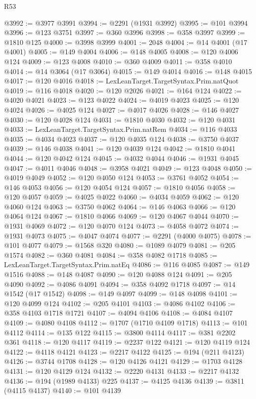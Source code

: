 \begin{lexlean}{R53}
\begin{coremodule}
@3992 := @3977 @3991
@3994 := @2291 (@1931 @3992)
@3995 := @101 @3994
@3996 := @123 @3751
@3997 := @360 @3996
@3998 := @358 @3997
@3999 := @1810 @125
@4000 := @3998 @3999
@4001 := 2048
@4004 := @14 @4001 (@17 @4001)
@4005 := @149 @4004
@4006 := @148 @4005
@4008 := @120 @4006 @124
@4009 := @123 @4008
@4010 := @360 @4009
@4011 := @358 @4010
@4014 := @14 @3064 (@17 @3064)
@4015 := @149 @4014
@4016 := @148 @4015
@4017 := @120 @4016
@4018 := LexLeanTarget.TargetSyntax.Prim.natQuot
@4019 := @116 @4018
@4020 := @120 @2026
@4021 := @164 @124
@4022 := @4020 @4021
@4023 := @123 @4022
@4024 := @4019 @4023
@4025 := @120 @4024
@4026 := @4025 @124
@4027 := @4017 @4026
@4028 := @146 @4027
@4030 := @120 @4028 @124
@4031 := @1810 @4030
@4032 := @120 @4031
@4033 := LexLeanTarget.TargetSyntax.Prim.natRem
@4034 := @116 @4033
@4035 := @4034 @4023
@4037 := @120 @4035 @124
@4038 := @3750 @4037
@4039 := @146 @4038
@4041 := @120 @4039 @124
@4042 := @1810 @4041
@4044 := @120 @4042 @124
@4045 := @4032 @4044
@4046 := @1931 @4045
@4047 := @4011 @4046
@4048 := @3958 @4021
@4049 := @123 @4048
@4050 := @4019 @4049
@4052 := @120 @4050 @124
@4053 := @3761 @4052
@4054 := @146 @4053
@4056 := @120 @4054 @124
@4057 := @1810 @4056
@4058 := @120 @4057
@4059 := @4025 @4022
@4060 := @4034 @4059
@4062 := @120 @4060 @124
@4063 := @3750 @4062
@4064 := @146 @4063
@4066 := @120 @4064 @124
@4067 := @1810 @4066
@4069 := @120 @4067 @4044
@4070 := @1931 @4069
@4072 := @120 @4070 @124
@4073 := @4058 @4072
@4074 := @1931 @4073
@4075 := @4047 @4074
@4077 := @2291 (@4000 @4075)
@4078 := @101 @4077
@4079 := @1568 @320
@4080 := @1089 @4079
@4081 := @205 @1574
@4082 := @360 @4081
@4084 := @358 @4082 @1718
@4085 := LexLeanTarget.TargetSyntax.Prim.natEq
@4086 := @116 @4085
@4087 := @149 @1516
@4088 := @148 @4087
@4090 := @120 @4088 @124
@4091 := @205 @4090
@4092 := @4086 @4091
@4094 := @358 @4092 @1718
@4097 := @14 @1542 (@17 @1542)
@4098 := @149 @4097
@4099 := @148 @4098
@4101 := @120 @4099 @124
@4102 := @205 @4101
@4103 := @4086 @4102
@4106 := @358 @4103 @1718 @1721
@4107 := @4094 @4106
@4108 := @4084 @4107
@4109 := @4080 @4108
@4112 := @1707 (@1710 @4109 @1718)
@4113 := @101 @4112
@4114 := @135 @122
@4115 := @3800 @4114
@4117 := @381 @2202 @361
@4118 := @120 @4117
@4119 := @2237 @122
@4121 := @120 @4119 @124
@4122 := @4118 @4121
@4123 := @2217 @4122
@4125 := @194 (@211 @4123)
@4126 := @3744 @1708
@4128 := @120 @4126 @4121
@4129 := @1703 @4128
@4131 := @120 @4129 @124
@4132 := @2220 @4131
@4133 := @2217 @4132
@4136 := @194 (@1989 @4133) @225
@4137 := @4125 @4136
@4139 := @3811 (@4115 @4137)
@4140 := @101 @4139

\end{coremodule}
\end{lexlean}
